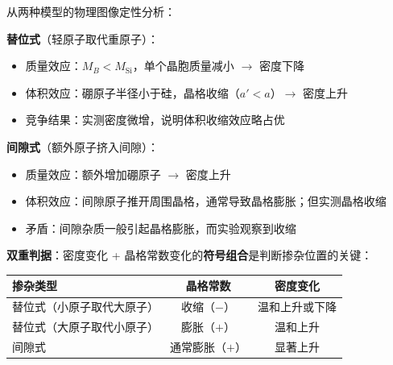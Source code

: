 \begin{insightbox}
从两种模型的物理图像定性分析：

\textbf{替位式}（轻原子取代重原子）：
\begin{itemize}
    \item 质量效应：$M_B < M_{\mathrm{Si}}$，单个晶胞质量减小 $\rightarrow$ 密度下降
    \item 体积效应：硼原子半径小于硅，晶格收缩（$a' < a$）$\rightarrow$ 密度上升
    \item 竞争结果：实测密度微增，说明体积收缩效应略占优
\end{itemize}

\textbf{间隙式}（额外原子挤入间隙）：
\begin{itemize}
    \item 质量效应：额外增加硼原子 $\rightarrow$ 密度上升
    \item 体积效应：间隙原子推开周围晶格，通常导致晶格膨胀；但实测晶格收缩
    \item 矛盾：间隙杂质一般引起晶格膨胀，而实验观察到收缩
\end{itemize}

\textbf{双重判据}：密度变化 + 晶格常数变化的\textbf{符号组合}是判断掺杂位置的关键：
\begin{center}
\begin{tabular}{lcc}
\toprule
\textbf{掺杂类型} & \textbf{晶格常数} & \textbf{密度变化} \\
\midrule
替位式（小原子取代大原子） & 收缩（$-$） & 温和上升或下降 \\
替位式（大原子取代小原子） & 膨胀（$+$） & 温和上升 \\
间隙式 & 通常膨胀（$+$） & 显著上升 \\
\bottomrule
\end{tabular}
\end{center}
\end{insightbox}

